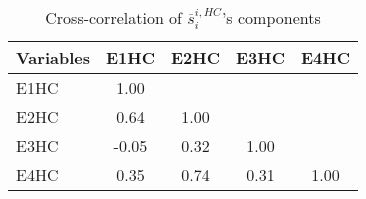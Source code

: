 \begin{table}[htbp]\centering \caption{Cross-correlation of $\overline{s}_{i}^{i,HC}$'s components\label{table:corretable}}
\begin{tabular}{l  c  c  c  c }\hline\hline
\multicolumn{1}{c}{Variables} &E1HC&E2HC&E3HC&E4HC\\ \hline
E1HC&1.00\\
E2HC&0.64&1.00\\
E3HC&-0.05&0.32&1.00\\
E4HC&0.35&0.74&0.31&1.00\\
\hline \hline 
 \end{tabular}
\end{table}
